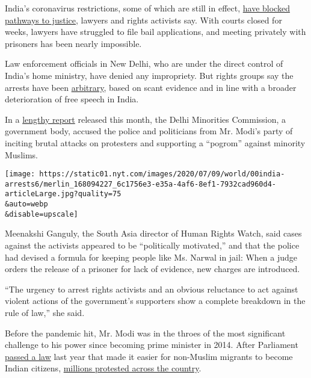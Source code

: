 India's coronavirus restrictions, some of which are still in effect,
\href{https://www.hrw.org/news/2020/06/15/india-end-bias-prosecuting-delhi-violence}{have
blocked pathways to justice}, lawyers and rights activists say. With
courts closed for weeks, lawyers have struggled to file bail
applications, and meeting privately with prisoners has been nearly
impossible.

Law enforcement officials in New Delhi, who are under the direct control
of India's home ministry, have denied any impropriety. But rights groups
say the arrests have been
\href{https://www.fidh.org/en/issues/human-rights-defenders/india-arbitrary-detention-of-several-defenders-for-protesting-against}{arbitrary},
based on scant evidence and in line with a broader deterioration of free
speech in India.

In a
\href{http://muslimmirror.com/eng/kapil-mishras-provocative-speech-responsible-for-delhi-violence-says-minorities-commission-report/}{lengthy
report} released this month, the Delhi Minorities Commission, a
government body, accused the police and politicians from Mr. Modi's
party of inciting brutal attacks on protesters and supporting a
``pogrom'' against minority Muslims.

\texttt{[image: https://static01.nyt.com/images/2020/07/09/world/00india-arrests6/merlin\_168094227\_6c1756e3-e35a-4af6-8ef1-7932cad960d4-articleLarge.jpg?quality=75\\\&auto=webp\\\&disable=upscale]}

Meenakshi Ganguly, the South Asia director of Human Rights Watch, said
cases against the activists appeared to be ``politically motivated,''
and that the police had devised a formula for keeping people like Ms.
Narwal in jail: When a judge orders the release of a prisoner for lack
of evidence, new charges are introduced.

``The urgency to arrest rights activists and an obvious reluctance to
act against violent actions of the government's supporters show a
complete breakdown in the rule of law,'' she said.

Before the pandemic hit, Mr. Modi was in the throes of the most
significant challenge to his power since becoming prime minister in
2014. After Parliament
\href{https://www.nytimes.com/2019/12/11/world/asia/india-muslims-citizenship-narendra-modi.html}{passed
a law} last year that made it easier for non-Muslim migrants to become
Indian citizens,
\href{https://www.nytimes.com/2019/12/16/world/asia/india-citizenship-protests.html}{millions
protested across the country}.

